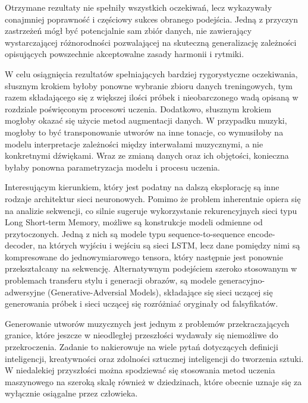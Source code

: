 {    \bigskip

    Otrzymane rezultaty nie spełniły wszystkich oczekiwań, lecz wykazywały conajmniej poprawność i\,\,częściowy
    sukces obranego podejścia. Jedną z\,\,przyczyn zastrzeżeń mógł być potencjalnie sam zbiór danych, nie 
    zawierający wystarczającej różnorodności pozwalającej na skuteczną generalizację zależności opisujących 
    powszechnie akceptowalne zasady harmonii i\,\,rytmiki.

    W\,\,celu osiągnięcia rezultatów spełniających bardziej rygorystyczne oczekiwania, słusznym krokiem byłoby
    ponowne wybranie zbioru danych treningowych, tym razem składającego się z\,\,większej ilości próbek i\,\,nieobarczonego
    wadą opisaną w\,\,rozdziale poświęconym procesowi uczenia. 
    Dodatkowo, słusznym krokiem mogłoby okazać się użycie metod augmentacji danych. W\,\,przypadku muzyki, mogłoby to
    być transponowanie utworów na inne tonacje, co wymusiłoby na modelu interpretacje zależności między interwałami
    muzycznymi, a\,\,nie konkretnymi dźwiękami.
    Wraz ze zmianą danych oraz ich objętości, konieczna byłaby ponowna parametryzacja modelu i\,\,procesu uczenia.

    \bigskip

    Interesującym kierunkiem, który jest podatny na dalszą eksplorację są inne rodzaje architektur sieci neuronowych.
    Pomimo że problem inherentnie opiera się na analizie sekwencji, co silnie sugeruje wykorzystanie rekurencyjnych 
    sieci typu Long Short-term Memory, możliwe są konstrukcje modeli odmienne od przytoczonych. Jedną z\,\,nich są modele typu 
    sequence-to-sequence encode-decoder, na których wyjściu i\,\,wejściu są sieci LSTM, lecz dane pomiędzy nimi są
    kompresowane do jednowymiarowego tensora, który następnie jest ponownie przekształcany na sekwencję. 
    Alternatywnym podejściem szeroko stosowanym w\,\,problemach transferu stylu i\,\,generacji obrazów, 
    są modele generacyjno-adwersyjne (Generative-Adversial Models), składające się sieci uczącej się generowania 
    próbek i\,\,sieci uczącej się rozróżniać oryginały od falsyfikatów.

    \bigskip

    Generowanie utworów muzycznych jest jednym z\,\,problemów przekraczających granice, które
    jeszcze w\,\,nieodległej przeszłości wydawały się niemożliwe do przekroczenia. Zadanie to nakierowuje na wiele pytań 
    dotyczących definicji inteligencji, kreatywności oraz zdolności sztucznej inteligencji do tworzenia sztuki. 
    W\,\,niedalekiej przyszłości można spodziewać się stosowania metod uczenia maszynowego na szeroką skalę również w\,\,dziedzinach,
    które obecnie uznaje się za wyłącznie osiągalne przez człowieka. 

}
